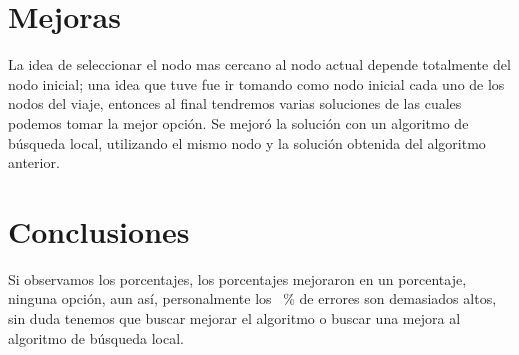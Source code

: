 \documentclass[12pt,a4paper]{article}
\begin{document}
\section{Mejoras}
La idea de seleccionar el nodo mas cercano al nodo actual depende totalmente del nodo inicial; una idea que tuve fue ir tomando como nodo inicial cada uno de los nodos del viaje, entonces al final tendremos varias soluciones de las cuales podemos tomar la mejor opción.
\newline Se mejoró la solución con un algoritmo de búsqueda local, utilizando el mismo nodo y la solución obtenida del algoritmo anterior.
\section{Conclusiones} 
Si observamos los porcentajes, los porcentajes mejoraron en un porcentaje, ninguna opción, aun así, personalmente los \,  \% de errores son demasiados altos, sin duda tenemos que buscar mejorar el algoritmo o buscar una mejora al algoritmo de búsqueda local.
\newpage

\end{document}
